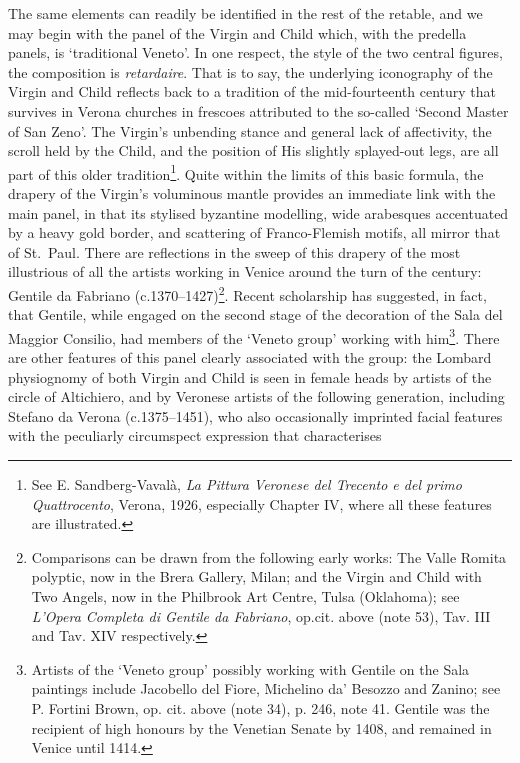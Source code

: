 \documentclass[a4paper,12pt]{article}
\begin{document}
The same elements can readily be identified in the rest of the
retable, and we may begin with the panel of the Virgin and Child
which, with the predella panels, is `traditional Veneto'. In one
respect, the style of the two central figures, the composition is
\textit{retardaire}.  That is to say, the underlying iconography of
the Virgin and Child reflects back to a tradition of the
mid-fourteenth century that survives in Verona churches in frescoes
attributed to the so-called `Second Master of San Zeno'. The Virgin's
unbending stance and general lack of affectivity, the scroll held by
the Child, and the position of His slightly splayed-out legs, are all
part of this older tradition\footnote{See E. Sandberg-Vaval\`a,
\textit{La Pittura Veronese del Trecento e del primo Quattrocento},
Verona, 1926, especially Chapter IV, where all these features are
illustrated.}. Quite within the limits of this basic formula, the
drapery of the Virgin's voluminous mantle provides an immediate link
with the main panel, in that its stylised byzantine modelling, wide
arabesques accentuated by a heavy gold border, and scattering of
Franco-Flemish motifs, all mirror that of St.~Paul. There are
reflections in the sweep of this drapery of the most illustrious of
all the artists working in Venice around the turn of the century:
Gentile da Fabriano (c.1370--1427)\footnote{Comparisons can be drawn
from the following early works: The Valle Romita polyptic, now in the
Brera Gallery, Milan; and the Virgin and Child with Two Angels, now in
the Philbrook Art Centre, Tulsa (Oklahoma); see \textit{L'Opera
Completa di Gentile da Fabriano}, op.cit. above (note 53), Tav. III
and Tav. XIV respectively.}. Recent scholarship has suggested, in
fact, that Gentile, while engaged on the second stage of the
decoration of the Sala del Maggior Consilio, had members of the
`Veneto group' working with him\footnote{Artists of the `Veneto group'
possibly working with Gentile on the Sala paintings include Jacobello
del Fiore, Michelino da' Besozzo and Zanino; see P. Fortini Brown,
op. cit. above (note 34), p. 246, note 41. Gentile was the recipient
of high honours by the Venetian Senate by 1408, and remained in Venice
until 1414.}. There are other features of this panel clearly
associated with the group: the Lombard physiognomy of both Virgin and
Child is seen in female heads by artists of the circle of Altichiero,
and by Veronese artists of the following generation, including Stefano
da Verona (c.1375--1451), who also occasionally imprinted facial
features with the peculiarly circumspect expression that characterises
\end{document}
